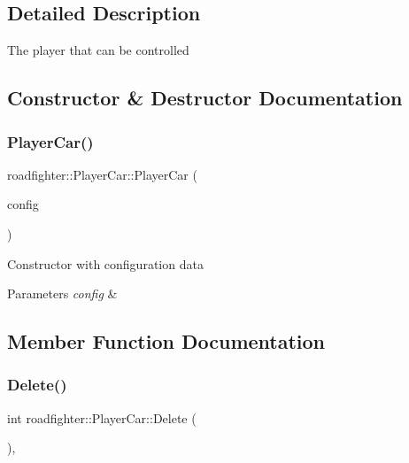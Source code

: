 \subsection{Detailed Description}
The player that can be controlled 

\subsection{Constructor \& Destructor Documentation}
\mbox{\label{classroadfighter_1_1PlayerCar_a9e0ee387eaede6b742174877c1d594d4}} 
\subsubsection{\texorpdfstring{Player\+Car()}{PlayerCar()}}
{\footnotesize\ttfamily roadfighter\+::\+Player\+Car\+::\+Player\+Car (\begin{DoxyParamCaption}\item[{std\+::shared\+\_\+ptr$<$ \hyperlink{classConfigData}{Config\+Data} $>$}]{config }\end{DoxyParamCaption})}

Constructor with configuration data 
\begin{DoxyParams}{Parameters}
{\em config} & \\
\hline
\end{DoxyParams}


\subsection{Member Function Documentation}
\mbox{\label{classroadfighter_1_1PlayerCar_a1c4a181eee7a89315680eca4892ebc32}} 
\subsubsection{\texorpdfstring{Delete()}{Delete()}}
{\footnotesize\ttfamily int roadfighter\+::\+Player\+Car\+::\+Delete (\begin{DoxyParamCaption}{ }\end{DoxyParamCaption})\hspace{0.3cm}{\ttfamily [override]}, {\ttfamily [virtual]}}

